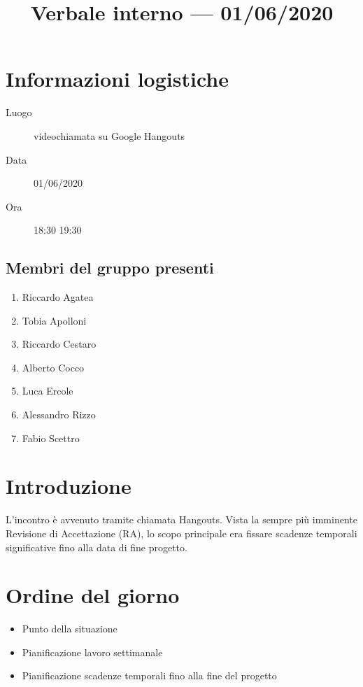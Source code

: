 \documentclass{article}
\title{Verbale interno --- 01/06/2020}
\begin{document}


\section{Informazioni logistiche}%
\label{sec:informazioni_logistiche}

\begin{description}
  \item [Luogo] videochiamata su Google Hangouts
  \item [Data] 01/06/2020
  \item [Ora] 18:30  19:30
\end{description}

\subsection{Membri del gruppo presenti}%
\label{sub:membri_del_gruppo_presenti}

\begin{enumerate}
  \item Riccardo Agatea
  \item Tobia Apolloni
  \item Riccardo Cestaro
  \item Alberto Cocco
  \item Luca Ercole
  \item Alessandro Rizzo
  \item Fabio Scettro
\end{enumerate}

\section{Introduzione}%
\label{sec:introduzione}
L'incontro è avvenuto tramite chiamata Hangouts.
Vista la sempre più imminente Revisione di Accettazione (RA), lo scopo principale era fissare scadenze temporali significative fino alla data di fine progetto.

\section{Ordine del giorno}%
\label{sec:ordine_del_giorno}

\begin{itemize}
  \item Punto della situazione
  \item Pianificazione lavoro settimanale
  \item Pianificazione scadenze temporali fino alla fine del progetto
\end{itemize}
\end{document}
